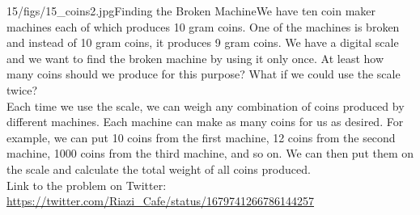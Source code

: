 \begin{problem}{15/figs/15_coins2.jpg}{Finding the Broken Machine}We have ten coin maker machines each of which produces 10 gram coins. One of the machines is broken and instead of 10 gram coins, it produces 9 gram coins. We have a digital scale and we want to find the broken machine by using it only once. At least how many coins should we produce for this purpose? What if we could use the scale twice? \\[0.2cm]

Each time we use the scale, we can weigh any combination of coins produced by different machines. Each machine can make as many coins for us as desired. For example, we can put 10 coins from the first machine, 12 coins from the second machine, 1000 coins from the third machine, and so on. We can then put them on the scale and calculate the total weight of all coins produced.\\[0.2cm]

Link to the problem on Twitter:  \url{https://twitter.com/Riazi_Cafe/status/1679741266786144257}\end{problem}